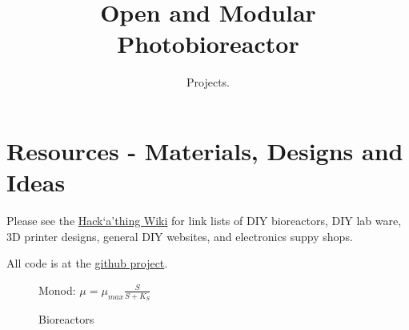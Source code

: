 \documentclass[12pt,a4paper]{scrartcl}
\title{Open and Modular Photobioreactor}
\subtitle{Projects.}
\begin{document}
\maketitle
\tableofcontents
\newpage


\section{Resources - Materials, Designs and Ideas}

Please see the
\href{https://wiki.hhu.de/display/QTBP/1st+QTB+PBR+Hack\%60a'thing}{Hack`a'thing
  Wiki} for link lists of DIY bioreactors, DIY lab ware, 3D printer
designs, general DIY websites, and electronics suppy shops.

All code is at the \href{https://github.com/raim/PBR}{github project}.

\begin{figure}[ht]
  \begin{minipage}{.49\textwidth}
  \end{minipage}
  \begin{minipage}{.49\textwidth}
    \centering Monod: $\mu = \mu_{max} \frac{S}{S+K_S}$\\
  \end{minipage}
\caption[]{Bioreactors}
\end{figure}
\end{document}
